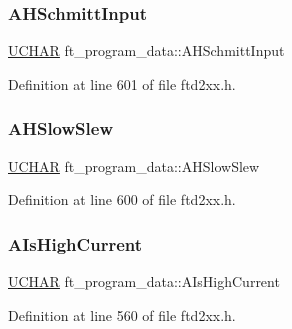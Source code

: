 \subsubsection{\texorpdfstring{A\+H\+Schmitt\+Input}{AHSchmittInput}}
{\footnotesize\ttfamily \hyperlink{CatCaloProto40MHz_2inc_2WinTypes_8h_a4f4bb67531a9bf6f0b9c6ad76aeba587}{U\+C\+H\+AR} ft\+\_\+program\+\_\+data\+::\+A\+H\+Schmitt\+Input}



Definition at line 601 of file ftd2xx.\+h.

\mbox{\label{structft__program__data_a70b579cf3a9556b651411f760017b8f3}} 
\subsubsection{\texorpdfstring{A\+H\+Slow\+Slew}{AHSlowSlew}}
{\footnotesize\ttfamily \hyperlink{CatCaloProto40MHz_2inc_2WinTypes_8h_a4f4bb67531a9bf6f0b9c6ad76aeba587}{U\+C\+H\+AR} ft\+\_\+program\+\_\+data\+::\+A\+H\+Slow\+Slew}



Definition at line 600 of file ftd2xx.\+h.

\mbox{\label{structft__program__data_ab068b8260060f66bc10856754d581061}} 
\subsubsection{\texorpdfstring{A\+Is\+High\+Current}{AIsHighCurrent}}
{\footnotesize\ttfamily \hyperlink{CatCaloProto40MHz_2inc_2WinTypes_8h_a4f4bb67531a9bf6f0b9c6ad76aeba587}{U\+C\+H\+AR} ft\+\_\+program\+\_\+data\+::\+A\+Is\+High\+Current}



Definition at line 560 of file ftd2xx.\+h.

\mbox{\label{structft__program__data_a7b4f9d2dc2727498a52028765f8b3a15}} 
